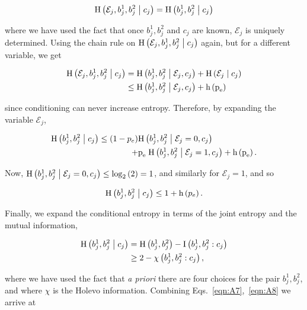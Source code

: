\begin{equation*}
\text{H}\left(\mathcal{E}_j, b_j^1, b_j^2 \; \middle| \; c_j\right) = \text{H}\left(b_j^1, b_j^2 \; \middle| \; c_j\right)
\end{equation*}

\noindent where we have used the fact that once $b_j^1, b_j^2$ and $c_j$ are known, $\mathcal{E}_j$ is uniquely determined. Using the chain rule on $\text{H}\left(\mathcal{E}_j, b_j^1, b_j^2 \; \middle| \; c_j\right)$ again, but for a different variable, we get

\begin{align*}
\text{H}\left(\mathcal{E}_j, b_j^1, b_j^2 \; \middle| \; c_j\right) &= \text{H}\left(b_j^1, b_j^2 \; \middle| \; \mathcal{E}_j, c_j\right) + \text{H}\left(\mathcal{E}_j \; \middle| \; c_j\right) \notag \\
&\le \text{H}\left(b_j^1, b_j^2 \; \middle| \; \mathcal{E}_j, c_j\right) + \text{h}\left(\text{p}_{\text{e}}\right)
\end{align*}

\noindent since conditioning can never increase entropy. Therefore, by expanding the variable $\mathcal{E}_j$,

\begin{align*}
\text{H}\left(b_j^1, b_j^2 \; \middle| \; c_j\right) \le \left(1 - p_e\right) &\text{H}\left(b_j^1, b_j^2 \; \middle| \; \mathcal{E}_j = 0, c_j\right) \\ + &\text{p}_{\text{e}} \; \text{H}\left(b_j^1, b_j^2 \; \middle| \; \mathcal{E}_j=1, c_j\right) + \text{h}\left(\text{p}_{\text{e}}\right).
\end{align*}

\noindent Now, $\text{H}\left(b_j^1, b_j^2 \; \middle| \; \mathcal{E}_j=0, c_j\right) \le \log_2\left(2\right) = 1$, and similarly for $\mathcal{E}_j=1$, and so

\begin{equation}\label{eqn:A7}
\text{H}\left(b_j^1, b_j^2 \; \middle| \; c_j\right) \le 1 + \text{h}\left(p_e\right).
\end{equation}

\noindent Finally, we expand the conditional entropy in terms of the joint entropy and the mutual information,

\begin{align}\label{eqn:A8}
\text{H}\left(b_j^1, b_j^2 \; \middle| \; c_j\right) &= \text{H}\left(b_j^1, b_j^2\right) - \text{I}\left(b_j^1, b_j^2 : c_j\right) \notag \\
&\ge 2 - \chi\left(b_j^1, b_j^2 : c_j\right),
\end{align}

\noindent where we have used the fact that \emph{a priori} there are four choices for the pair $b_j^1, b_j^2$, and where $\chi$ is the Holevo information. Combining Eqs.~\ref{eqn:A7},~\ref{eqn:A8} we arrive at

